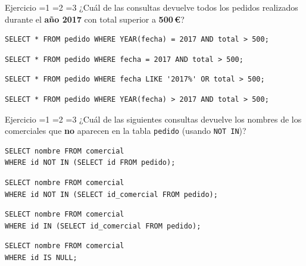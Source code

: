 \documentclass[12pt, a4paper]{article}
\newcommand{\estrella}{{\color{Goldenrod}\faStarSolid}}
\newcommand{\estrellavacia}{{\color{gray!45}\faStarSolid}}
\newcommand{\nivel}[1]{%
  \ifnum#1=1\estrella\estrellavacia\estrellavacia\fi
  \ifnum#1=2\estrella\estrella\estrellavacia\fi
  \ifnum#1=3\estrella\estrella\estrella\fi
}
\newcounter{numej}
\newcommand{\ej}{\stepcounter{numej}\thenumej}
\begin{document}
\begin{ejercicio}{Ejercicio \ej}{\nivel{1}}
¿Cuál de las consultas devuelve todos los pedidos realizados durante
el \textbf{año 2017} con total superior a \textbf{500\,€}?

\begin{opciones}
  \item
\begin{lstlisting}
SELECT * FROM pedido WHERE YEAR(fecha) = 2017 AND total > 500;
\end{lstlisting}
  \item
\begin{lstlisting}
SELECT * FROM pedido WHERE fecha = 2017 AND total > 500;
\end{lstlisting}
  \item
\begin{lstlisting}
SELECT * FROM pedido WHERE fecha LIKE '2017%' OR total > 500;
\end{lstlisting}
  \item
\begin{lstlisting}
SELECT * FROM pedido WHERE YEAR(fecha) > 2017 AND total > 500;
\end{lstlisting}
\end{opciones}
\end{ejercicio}

\begin{ejercicio}{Ejercicio \ej}{\nivel{2}}
¿Cuál de las siguientes consultas devuelve los nombres de los
comerciales que \textbf{no} aparecen en la tabla \texttt{pedido}
(usando \texttt{NOT IN})?

\begin{opciones}
  \item
\begin{lstlisting}
SELECT nombre FROM comercial
WHERE id NOT IN (SELECT id FROM pedido);
\end{lstlisting}
  \item
\begin{lstlisting}
SELECT nombre FROM comercial
WHERE id NOT IN (SELECT id_comercial FROM pedido);
\end{lstlisting}
  \item
\begin{lstlisting}
SELECT nombre FROM comercial
WHERE id IN (SELECT id_comercial FROM pedido);
\end{lstlisting}
  \item
\begin{lstlisting}
SELECT nombre FROM comercial
WHERE id IS NULL;
\end{lstlisting}
\end{opciones}
\end{ejercicio}
\end{document}
